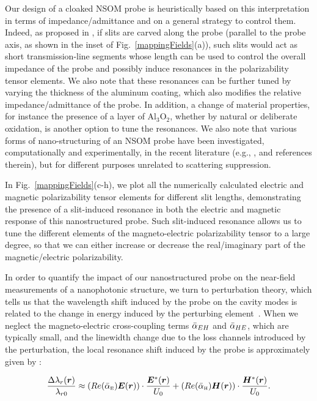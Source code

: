 \documentclass{osa-article}
\begin{document}
	Our design of a cloaked NSOM probe is heuristically based on this interpretation in terms of impedance/admittance and on a general strategy to control them. Indeed, as proposed in \cite{Chen_2017}, if slits are carved along the probe (parallel to the probe axis, as shown in the inset of Fig.~\ref{mappingFields}(a)), such slits would act as short transmission-line segments whose length can be used to control the overall impedance of the probe and possibly induce resonances in the polarizability tensor elements. We also note that these resonances can be further tuned by varying the thickness of the aluminum coating, which also modifies the relative impedance/admittance of the probe. In addition, a change of material properties, for instance the presence of a layer of Al$_{3}$O${_2}$, whether by natural or deliberate oxidation, is another option to tune the resonances. We also note that various forms of nano-structuring of an NSOM probe have been investigated, computationally and experimentally, in the recent literature (e.g., \cite{fleischer2012near,smajic2011numerical,qian2015plasmonic}, and references therein), but for different purposes unrelated to scattering suppression. \par
	In Fig.~\ref{mappingFields}(c-h), we plot all the numerically calculated electric and magnetic polarizability tensor elements for different slit lengths, demonstrating the presence of a slit-induced resonance in both the electric and magnetic response of this nanostructured probe. Such slit-induced resonance allows us to tune the different elements of the magneto-electric polarizability tensor to a large degree, so that we can either increase or decrease the real/imaginary part of the magnetic/electric polarizability.\par 
	In order to quantify the impact of our nanostructured probe on the near-field measurements of a nanophotonic structure, we turn to perturbation theory, which  tells us that the wavelength shift induced by the probe on the cavity modes is related to the change in energy induced by the perturbing element~\cite{Koenderink_2005}. When we neglect the magneto-electric cross-coupling terms $\bar{\bf{\alpha}}_{EH}$ and $\bar{\bf{\alpha}}_{HE}$, which are typically small, and the linewidth change due to the loss channels introduced by the perturbation, the local resonance shift induced by the probe is approximately given by \cite{Koenderink_2005, Burresi_2010}:
	
	\begin{equation}\label{equationshift}
		\frac{\Delta \lambda_{r}(\bm{r})}{\lambda_{r0}}\approx (Re(\bar{\alpha}_{\mbox{\tiny{E}}}) \bm{E}(\bm{r}))\cdot \frac{\bm{E}^{*}(\bm{r})}{U_0} +(Re({\bar{\alpha}}_{\mbox{\tiny{H}}}) \bm{H}(\bm{r}))\cdot \frac{ \bm{H} ^{*}(\bm{r})}{U_0}.
	\end{equation}
	
\end{document}
